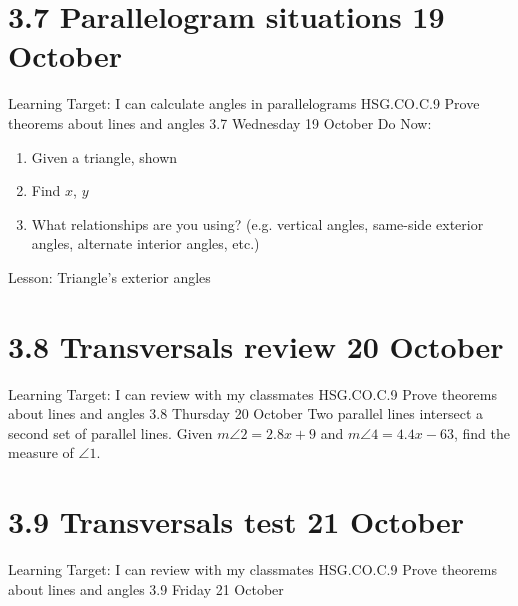 \section{3.7 Parallelogram situations \hfill 19 October}
\begin{frame}{Learning Target: I can calculate angles in parallelograms}
  {HSG.CO.C.9 Prove theorems about lines and angles  \hfill \alert{3.7 Wednesday 19 October}}
  Do Now: 
  \begin{multicols}{2}
    \begin{enumerate}
      \item Given a triangle, shown
      \item Find $x$, $y$
      \item What relationships are you using? (e.g. vertical angles, same-side exterior angles, alternate interior angles, etc.)
    \end{enumerate}
  \end{multicols}
  Lesson: Triangle's exterior angles
\end{frame}

\section{3.8 Transversals review \hfill 20 October}
\begin{frame}{Learning Target: I can review with my classmates}
  {HSG.CO.C.9 Prove theorems about lines and angles \hfill \alert{3.8 Thursday 20 October}}
  Two parallel lines intersect a second set of parallel lines. Given $m\angle 2 = 2.8x+9$ and $m\angle 4 = 4.4x - 63$, find the measure of $\angle 1$. 
  \begin{flushright}
    \end{flushright}
\end{frame}

\section{3.9 Transversals test \hfill 21 October}
\begin{frame}{Learning Target: I can review with my classmates}
  {HSG.CO.C.9 Prove theorems about lines and angles \hfill \alert{3.9 Friday 21 October}}

\end{frame}


